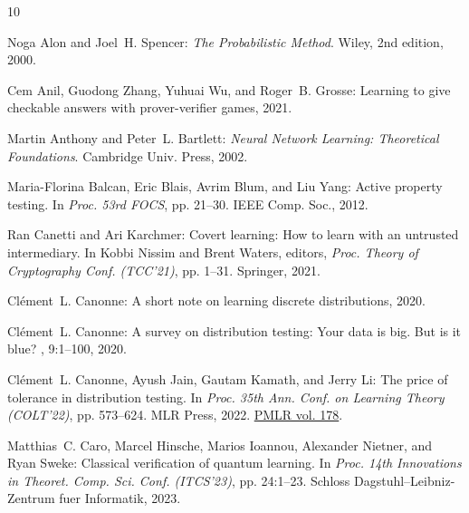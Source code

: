 \documentclass[11pt]{article}
\begin{document}
\tocrefpdfbookmark
\begin{thebibliography}{10}

{\sc Noga Alon and Joel~H. Spencer}: {\em The Probabilistic Method}.
\newblock Wiley, 2nd edition, 2000.
\newblock [\epfmtdoi{10.1002/0471722154}]

{\sc Cem Anil, Guodong Zhang, Yuhuai Wu, and Roger~B. Grosse}: Learning to give
  checkable answers with prover-verifier games, 2021.

{\sc Martin Anthony and Peter~L. Bartlett}: {\em Neural Network Learning:
  Theoretical Foundations}.
\newblock Cambridge Univ. Press, 2002.

{\sc Maria{-}Florina Balcan, Eric Blais, Avrim Blum, and Liu Yang}: Active
  property testing.
\newblock In {\em Proc. 53rd FOCS}, pp. 21--30. IEEE Comp. Soc., 2012.

{\sc Ran Canetti and Ari Karchmer}: Covert learning: How to learn with an
  untrusted intermediary.
\newblock In {\sc Kobbi Nissim and Brent Waters}, editors, {\em Proc. Theory of
  Cryptography Conf. (TCC'21)}, pp. 1--31. Springer, 2021.
\newblock [\epfmtdoi{10.1007/978-3-030-90456-2\_1}]

{\sc Cl{\'{e}}ment~L. Canonne}: A short note on learning discrete
  distributions, 2020.

{\sc Cl{\'e}ment~L. Canonne}: A survey on distribution testing: Your data is
  big. {B}ut is it blue?
, 9:1--100, 2020.

{\sc Cl{\'{e}}ment~L. Canonne, Ayush Jain, Gautam Kamath, and Jerry Li}: The
  price of tolerance in distribution testing.
\newblock In {\em Proc. 35th Ann. Conf. on Learning Theory (COLT'22)}, pp.
  573--624. MLR Press, 2022.
\newblock \href{https://proceedings.mlr.press/v178/canonne22a.html}{PMLR vol.
  178}.

{\sc Matthias~C. Caro, Marcel Hinsche, Marios Ioannou, Alexander Nietner, and
  Ryan Sweke}: Classical verification of quantum learning.
\newblock In {\em Proc. 14th Innovations in Theoret. Comp. Sci. Conf.
  (ITCS'23)}, pp. 24:1--23. Schloss Dagstuhl--Leibniz-Zentrum fuer Informatik,
  2023.


\end{thebibliography}
\end{document}

